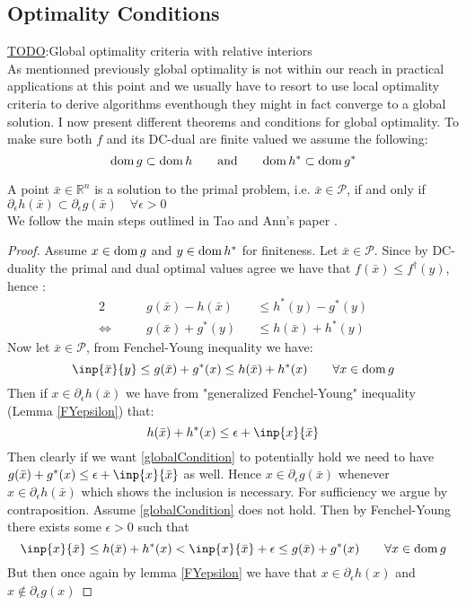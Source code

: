\subsection{Optimality Conditions}
\underline{TODO}:Global optimality criteria with relative interiors 
\autocite{tao2005dc}\\

As mentionned previously global optimality is not within our
reach in practical applications at this point and we usually have to resort to
use local optimality criteria to derive algorithms eventhough they might 
in fact converge to a global solution. I now present different theorems
and conditions for global optimality. To make sure both $f$ and its DC-dual
are finite valued we assume the following:
\begin{equation}
	\mathrm{dom} \, g \subset \mathrm{dom} \, h \qquad\text{and}\qquad
	\mathrm{dom} \,   h^* \subset \mathrm{dom} \, g^*
\end{equation}
\begin{theorem}
A point $\bar x\in \mathbb R^n$ is a solution to the primal
problem, i.e. $\bar x\in \mathcal P$, if and only if 
$\partial_\epsilon h(\bar x) \subset \partial_\epsilon g(\bar x)\quad \forall
\epsilon >0$\\
We follow the main steps outlined in Tao and Ann's paper \autocite{tao1997convex}.
\end{theorem}
\begin{proof}
Assume $x\in\mathrm{dom} \, g$ and $y\in\mathrm{dom} \, h^*$ for finiteness.
Let $\bar x \in \mathcal P$. Since by DC-duality
the primal and dual optimal values agree we have that  $f(\bar x) \leq
f^\dagger(y)$, hence : 
\begin{alignat}{2}
	&g(\bar x) -h(\bar x) &&\leq h^*(y)-g^*(y)\\
	\iff \qquad &g(\bar x) + g^*(y) &&\leq h(\bar x) + h^*(y) 
		     \label{globalCondition}
\end{alignat}
%
Now let $\bar x\in \mathcal P$, from Fenchel-Young inequality we have:
\begin{equation}
	\inp{\bar x}{y} \leq g(\bar x)+g^*(x)\leq h(\bar x)+h^*(x) \qquad
	\forall x\in\ddom g
\end{equation}
Then if $x\in\partial_\epsilon h(\bar x)$ we have from "generalized 
Fenchel-Young" inequality (Lemma \ref{FYepsilon}) that:
\begin{equation*}
	h(\bar x)+ h^*(x) \leq \epsilon + \inp{x}{\bar x}
\end{equation*}
Then clearly if we want \eqref{globalCondition} to potentially hold we need to
have $g(\bar x)+ g^*(x) \leq \epsilon + \inp{x}{\bar x}$
as well. Hence $x\in \partial_\epsilon g(\bar x)$ whenever $x\in
\partial_\epsilon h(\bar x)$ which shows the inclusion is necessary. For 
sufficiency we argue by contraposition. Assume \eqref{globalCondition} does not
hold. Then by Fenchel-Young there exists
some $\epsilon>0$ such that
\begin{equation*}
	\inp{x}{\bar x} \leq h(\bar x)+h^*(x)< \inp{x}{\bar x} + \epsilon 
	\leq g(\bar x) + g^*(x) \qquad \forall x\in\ddom g
\end{equation*}
But then once again by lemma \ref{FYepsilon} we have that
$x\in\partial_\epsilon h(x)$ and $x\not\in\partial_\epsilon g(x)$
\end{proof}
\clearpage

